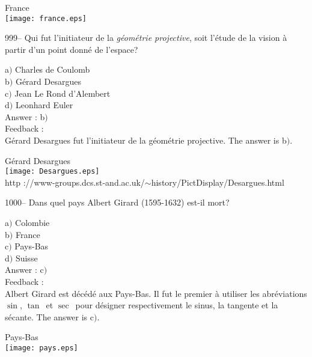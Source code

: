 ﻿\documentclass[letterpaper, 12pt]{article}
\begin{document}
        \begin{center}
        France\\
    \texttt{[image: france.eps]}\\
    \end{center}

999-- Qui fut l'initiateur de la {\sl g\'eom\'etrie projective},
soit l'\'etude de la vision \`a partir d'un point donn\'e de
l'espace?

a$)$ Charles de Coulomb \\
b$)$ G\'erard Desargues\\
c$)$ Jean Le Rond d'Alembert \\
d$)$ Leonhard Euler\\

Answer : b$)$\\

Feedback : \\
G\'erard Desargues fut l'initiateur de la g\'eom\'etrie projective.
The answer is b$)$.\\



    \begin{center}
        G\'erard Desargues\\
    \texttt{[image: Desargues.eps]}\\
        {\footnotesize http
://www-groups.dcs.st-and.ac.uk/$\sim$history/PictDisplay/Desargues.html}
    \end{center}

1000-- Dans quel pays Albert Girard (1595-1632) est-il mort?

a$)$ Colombie \\
b$)$ France \\
c$)$ Pays-Bas \\
d$)$ Suisse\\

Answer : c$)$\\

Feedback : \\
Albert Girard est d\'ec\'ed\'e aux Pays-Bas. Il fut le premier \`a
utiliser les abr\'eviations \og $\sin$\fg, \og $\tan$\fg\ et \og
$\sec$\fg\ pour d\'esigner respectivement le sinus, la tangente et
la s\'ecante.
The answer is c$)$.\\

        \begin{center}
        Pays-Bas\\
    \texttt{[image: pays.eps]}\\
    \end{center}
\end{document}
